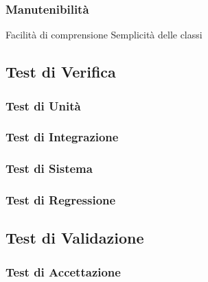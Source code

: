 		\subsubsection{Manutenibilità}
			Facilità di comprensione 	%
			Semplicità delle classi
	
	
	\subsection{Test di Verifica}
		\subsubsection{Test di Unità}
		\subsubsection{Test di Integrazione}
		\subsubsection{Test di Sistema}	
		\subsubsection{Test di Regressione}
	
	
	
	\subsection{Test di Validazione}
		\subsubsection{Test di Accettazione}	
